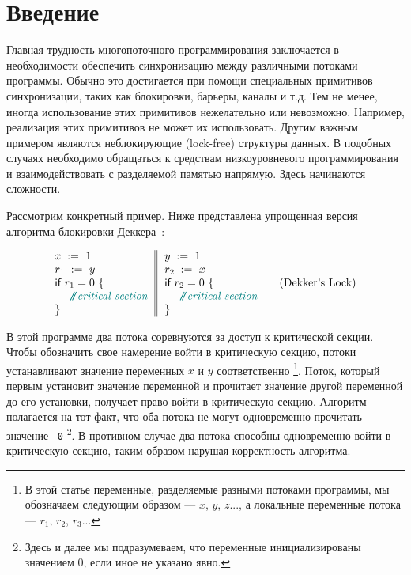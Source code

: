 \section{Введение}
\label{sec:intro}

Главная трудность многопоточного программирования 
заключается в необходимости обеспечить  
синхронизацию между различными потоками программы. 
Обычно это достигается при помощи специальных 
примитивов синхронизации, 
таких как блокировки, барьеры, каналы и т.д. 
Тем не менее, иногда использование этих примитивов 
 нежелательно или невозможно. 
Например, реализация этих 
примитивов не может их использовать. 
Другим важным примером являются  неблокирующие (lock-free) структуры данных.
В подобных случаях необходимо обращаться к средствам
низкоуровневого программирования и 
взаимодействовать с разделяемой памятью напрямую.
Здесь начинаются сложности. 

Рассмотрим конкретный пример.
Ниже представлена упрощенная версия 
алгоритма блокировки Деккера~\cite{Dijkstra:68}:

\begin{equation*}
\inarrII{
  \writeInst{}{x}{1} \\
  \readInst{}{r_1}{y}  \\
  \kw{if} {r_1 = 0} ~\{ \\
  ~~ \comment{critical section} \\
  \}
}{
  \writeInst{}{y}{1} \\
  \readInst{}{r_2}{x}  \\
  \kw{if} {r_2 = 0} ~\{ \\
  ~~ \comment{critical section} \\
  \}
}
\tag{Dekker's Lock}\label{ex:Dekker}
\end{equation*}

В этой программе два потока соревнуются за доступ к критической секции.
Чтобы обозначить свое намерение войти в критическую секцию,
потоки устанавливают значение переменных $x$ и $y$ соответственно%
\footnote{В этой статье  переменные,  разделяемые разными потоками программы, мы обозначаем следующим образом ---
 $x$, $y$, $z$..., а локальные  
 переменные  потока --- $r_1$, $r_2$, $r_3$...}.
Поток, который первым установит значение переменной и 
прочитает значение другой переменной до его установки,
получает право войти в критическую секцию.
Алгоритм полагается на тот факт, что оба 
потока не могут одновременно прочитать значение ~\texttt{0}%
\footnote{Здесь и далее  мы подразумеваем, 
что переменные инициализированы значением 0, если иное не указано явно.}.
В противном случае два потока способны одновременно 
войти в критическую секцию, таким образом нарушая корректность алгоритма. 

